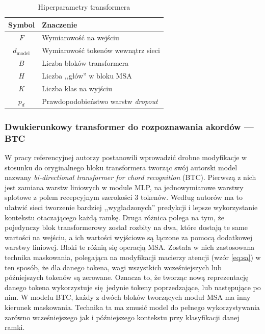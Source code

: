 \begin{table}
    \centering
    \caption{Hiperparametry transformera}
    \label{tab:transformer_params}
    \begin{tabular}{|c|l|} \hline
        Symbol & Znaczenie \\ \hline
        $F$ & Wymiarowość na wejściu \\
        $d_{\mathrm{model}}$ & Wymiarowość tokenów wewnątrz sieci \\
        $B$ & Liczba bloków transformera \\
        $H$ & Liczba ,,głów'' w bloku MSA \\
        $K$ & Liczba klas na wyjściu \\
        $p_d$ & Prawdopodobieństwo warstw \emph{dropout} \\ \hline
    \end{tabular}
\end{table}

\subsubsection{Dwukierunkowy transformer do rozpoznawania akordów --- BTC}

W pracy referencyjnej \cite{park_bi-directional_2019} autorzy postanowili wprowadzić drobne
modyfikacje w stosunku do oryginalnego bloku transformera tworząc swój autorski model nazwany
\emph{bi-directional transformer for chord recognition} (BTC). Pierwszą z nich jest zamiana warstw
liniowych w module MLP, na jednowymiarowe warstwy splotowe z polem recepcyjnym szerokości 3 tokenów.
Według autorów ma to ułatwić sieci tworzenie bardziej ,,wygładzonych'' predykcji i lepsze
wykorzystanie kontekstu otaczającego każdą ramkę. Druga różnica polega na tym, że pojedynczy blok
transformerowy został rozbity na dwa, które dostają te same wartości na wejściu, a ich wartości
wyjściowe są łączone za pomocą dodatkowej warstwy liniowej. Bloki te różnią się operacją MSA.
Została w nich zastosowana technika maskowania, polegająca na modyfikacji macierzy atencji (wzór
\ref{eq:sa}) w ten sposób, że dla danego tokena, wagi wszystkich wcześniejszych lub późniejszych
tokenów są zerowane. Oznacza to, że tworząc nową reprezentację danego tokena wykorzystuje
się jedynie tokeny poprzedzające, lub następujące po nim. W modelu BTC, każdy z dwóch bloków
tworzących moduł MSA ma inny kierunek maskowania. Technika ta ma zmusić model do pełnego
wykorzystywania zarówno wcześniejszego jak i późniejszego kontekstu przy klasyfikacji danej ramki.




